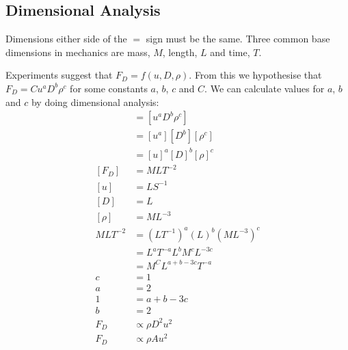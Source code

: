 \documentclass{article}
\begin{document}
    \subsection{Dimensional Analysis}
    Dimensions either side of the \(=\) sign must be the same. Three common base dimensions in mechanics are mass, \(M\), length, \(L\) and time, \(T\).
    
    \example
    Experiments suggest that \(F_D = f(u, D, \rho)\). 
    From this we hypothesise that \(F_D = Cu^aD^b\rho^c\) for some constants \(a\), \(b\), \(c\) and \(C\). 
    We can calculate values for \(a\), \(b\) and \(c\) by doing dimensional analysis:
    \begin{align*}
        [F_D] &= [u^aD^b\rho^c]\\
        &= [u^a][D^b][\rho^c]\\
        &= [u]^a[D]^b[\rho]^c\\
        [F_D] &= MLT^{-2}\\
        [u] &= LS^{-1}\\
        [D] &= L\\
        [\rho] &= ML^{-3}\\
        MLT^{-2} &= (LT^{-1})^a(L)^b(ML^{-3})^c\\
        &= L^aT^{-a}L^bM^cL^{-3c}\\
        &= M^CL^{a+b-3c}T^{-a}\\
        c &= 1\\
        a &= 2\\
        1 &= a + b - 3c\\
        b &= 2\\
        F_D &\propto \rho D^2u^2\\
        F_D &\propto \rho Au^2
    \end{align*}
    
\end{document}
